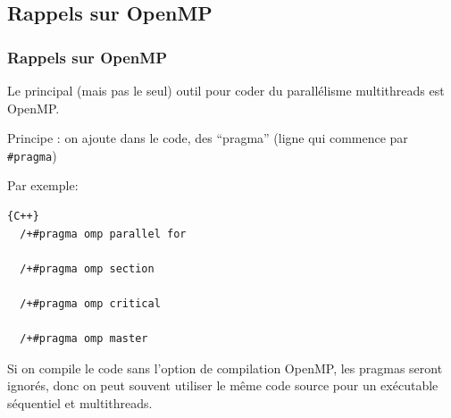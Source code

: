 \documentclass{beamer}
\begin{document}
%
%
%
%
%

\begin{frame}[fragile]
	\section{Rappels sur OpenMP}
	\frametitle{Rappels sur OpenMP}
	\vfill
	Le principal (mais pas le seul) outil pour coder du parallélisme multithreads est OpenMP.

    \vfill
\end{frame}

\begin{frame}[fragile]
Principe : on ajoute dans le code, des ``pragma'' (ligne qui commence par \verb|#pragma|)

\vfill
Par exemple:

\vfill
{}

\begin{lstlisting}{C++}
  /+#pragma omp parallel for

  /+#pragma omp section

  /+#pragma omp critical

  /+#pragma omp master
\end{lstlisting}

\vfill
Si on compile le code sans l'option de compilation OpenMP, les pragmas seront ignorés, donc on peut souvent utiliser le même code source pour un exécutable séquentiel et multithreads.   

\end{frame}
\end{document}
